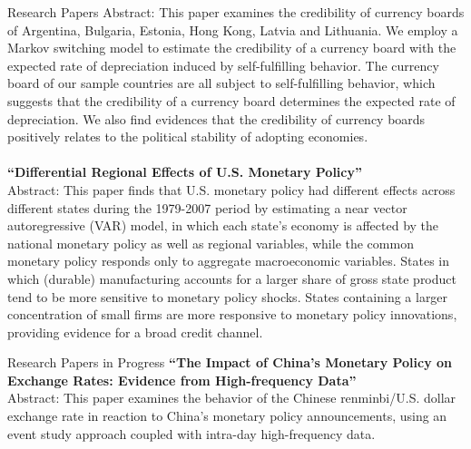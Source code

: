 \documentclass{resume_liang} %
\begin{document}
\begin{rSection}{Research Papers}
Abstract: This paper examines the credibility of currency boards of Argentina, Bulgaria, Estonia, Hong Kong, Latvia and Lithuania. We employ a Markov switching model to estimate the credibility of a currency board with the expected rate of depreciation induced by self-fulfilling behavior. The currency board of our sample countries are all subject to self-fulfilling behavior, which suggests that the credibility of a currency board determines the expected rate of depreciation. We also find evidences that the credibility of currency boards positively relates to the political stability of adopting economies.
\\
\\
\textbf{``Differential Regional Effects of U.S. Monetary Policy''} \\
Abstract: This paper finds that U.S. monetary policy had different effects across different states during the 1979-2007 period by estimating a near vector autoregressive (VAR) model, in which each state's economy is affected by the national monetary policy as well as regional variables, while the common monetary policy responds only to aggregate macroeconomic variables. States in which (durable) manufacturing accounts for a larger share of gross state product tend to be more sensitive to monetary policy shocks. States containing a larger concentration of small firms are more responsive to
monetary policy innovations, providing evidence for a broad credit channel.
\\

\end{rSection}
\bigskip \bigskip




\begin{rSection}{Research Papers in Progress}
\textbf{``The Impact of China's Monetary Policy on Exchange Rates: Evidence from High-frequency Data''}\\
Abstract: This paper examines the behavior of the Chinese renminbi/U.S. dollar exchange rate in reaction to China's monetary policy announcements, using an event study approach coupled with intra-day high-frequency data.

\end{rSection}
\bigskip \bigskip
\end{document}
